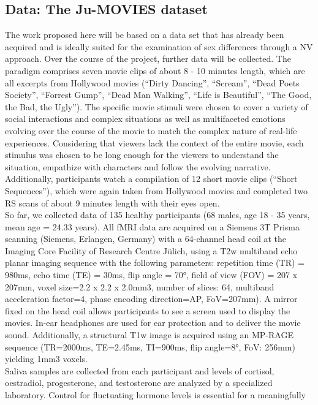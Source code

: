 \documentclass[11pt,a4paper]{article}
\begin{document}
\subsection*{Data: The Ju-MOVIES dataset}
The work proposed here will be based on a data set that has already been acquired and is ideally suited for 
the examination of sex differences through a NV approach. Over the course of the project, further data will be collected.
The paradigm comprises seven movie clips of about 8 - 10 minutes length, which are all excerpts from Hollywood movies 
(“Dirty Dancing”, “Scream”, “Dead Poets Society”, “Forrest Gump”, “Dead Man Walking”, “Life is Beautiful”, 
“The Good, the Bad, the Ugly”). The specific movie stimuli were chosen to cover a variety of social interactions 
and complex situations as well as multifaceted emotions evolving over the course of the movie to match 
the complex nature of real-life experiences. Considering that viewers lack the context of the entire movie, 
each stimulus was chosen to be long enough for the viewers to understand the situation, empathize with characters and 
follow the evolving narrative. Additionally, participants watch a compilation of 12 short movie clips (“Short Sequences”),
which were again taken from Hollywood movies and completed two RS scans of about 9 minutes length with their eyes open. \\
So far, we collected data of 135 healthy participants (68 males, age 18 - 35 years, mean age = 24.33 years). 
All fMRI data are acquired on a Siemens 3T Prisma scanning (Siemens, Erlangen, Germany) with a 64-channel head coil 
at the Imaging Core Facility of Research Centre Jülich, using a T2w multiband echo planar imaging sequence with the 
following parameters: repetition time (TR) = 980ms, echo time (TE) = 30ms, flip angle = 70°, field of view 
(FOV) = 207 x 207mm, voxel size=2.2 x 2.2 x 2.0mm3, number of slices: 64, multiband acceleration factor=4, 
phase encoding direction=AP,  FoV=207mm). A mirror fixed on the head coil allows participants to see a screen used 
to display the movies. In-ear headphones are used for ear protection and to deliver the movie sound. 
Additionally, a structural T1w image is acquired using an MP-RAGE sequence (TR=2000ms, TE=2.45ms, TI=900ms, 
flip angle=8°, FoV: 256mm) yielding 1mm3 voxels.\\
Saliva samples are collected from each participant and levels of cortisol, oestradiol, progesterone, and testosterone 
are analyzed by a specialized laboratory. Control for fluctuating hormone levels is essential for a meaningfully 
\end{document}
